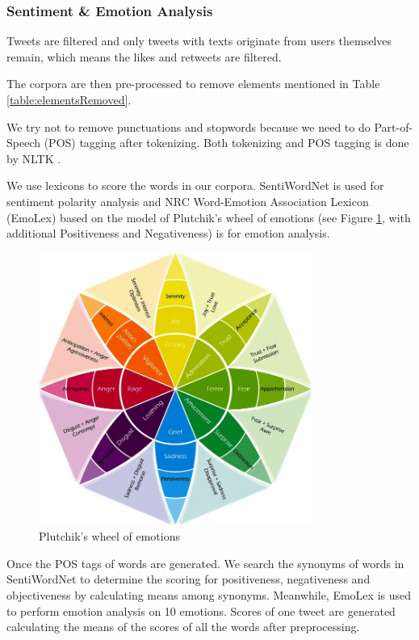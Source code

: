 \subsubsection{Sentiment \& Emotion Analysis}

Tweets are filtered and only tweets with texts originate from users themselves remain, which means the likes and retweets are filtered.

The corpora are then pre-processed to remove elements mentioned in Table \ref{table:elementsRemoved}.

We try not to remove punctuations and stopwords because we need to do Part-of-Speech (POS) tagging after tokenizing. Both tokenizing and POS tagging is done by NLTK \citep{NLTK}.

We use lexicons to score the words in our corpora. SentiWordNet is used for sentiment polarity analysis and NRC Word-Emotion Association Lexicon (EmoLex) \citep{Mohammad13} based on the model of Plutchik’s wheel of emotions \citep{plutchik2003emotions} (see Figure \ref{fig:wheel}, with additional Positiveness and Negativeness) is for emotion analysis.

\begin{figure}[h]
  \centering
  \includegraphics[width=0.8\textwidth]{images/wheel-of-emotions.jpg}
  \caption{Plutchik’s wheel of emotions}
  \label{fig:wheel}
\end{figure}

Once the POS tags of words are generated. We search the synonyms of words in SentiWordNet to determine the scoring for positiveness, negativeness and objectiveness by calculating means among synonyms. Meanwhile, EmoLex is used to perform emotion analysis on 10 emotions. Scores of one tweet are generated calculating the means of the scores of all the words after preprocessing.

